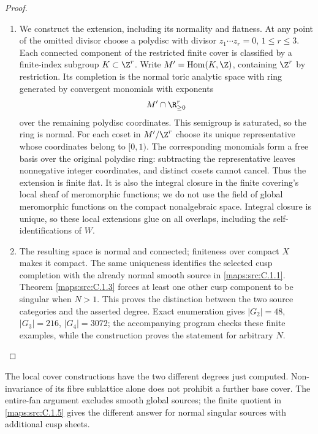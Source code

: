 \begin{proof}
\begin{enumerate}[label=\arabic*.,leftmargin=*]
\item We construct the extension, including its normality and flatness.
At any point of the omitted divisor choose a polydisc with divisor
$z_1\cdots z_r=0$, $1\leq r\leq3$. Each connected component of
the restricted finite cover is classified by a finite-index subgroup
$K\subset\Z^r$. Write $M'=\operatorname{Hom}(K,\Z)$, containing
$\Z^r$ by restriction. Its completion is the normal toric analytic
space with ring generated by convergent monomials with exponents
\[
 M'\cap\R_{\geq0}^r
\]
over the remaining polydisc coordinates. This semigroup is saturated,
so the ring is normal. For each coset in $M'/\Z^r$ choose its unique
representative whose coordinates belong to $[0,1)$. The corresponding
monomials form a free basis over the original polydisc ring: subtracting
the representative leaves nonnegative integer coordinates, and distinct
cosets cannot cancel. Thus the extension is finite flat. It is also
the integral closure in the finite covering's local sheaf of meromorphic
functions; we do not use the field of global meromorphic functions on
the compact nonalgebraic space.
Integral closure is unique, so these local extensions glue on all
overlaps, including the self-identifications of $W$.

\item The resulting space is normal and connected; finiteness over compact
$X$ makes it compact. The same uniqueness identifies the selected
cusp completion with the already normal smooth source in \ref{maps:src:C.1.1}.
Theorem \ref{maps:src:C.1.3} forces at least one other cusp component to be singular
when $N>1$. This proves the distinction between the two source
categories and the asserted degree. Exact enumeration gives
$|G_2|=48$, $|G_3|=216$, $|G_4|=3072$; the accompanying program
checks these finite examples, while the construction proves the
statement for arbitrary $N$.
\end{enumerate}
\end{proof}

The local cover constructions have the two different degrees just computed. Non-invariance of its fibre sublattice alone
does not prohibit a further base cover. The entire-fan argument excludes
smooth global sources; the finite quotient in \ref{maps:src:C.1.5} gives the different
answer for normal singular sources with additional cusp sheets.

